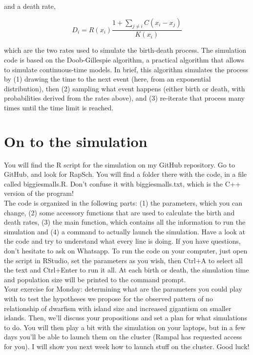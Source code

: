 \documentclass[12pt]{article}
\begin{document}
and a death rate,

\[
D_i = R(x_i) \frac{1 + \sum_{j \neq i} C(x_i - x_j)}{K(x_i)}
\]

which are the two rates used to simulate the birth-death process. The simulation code is based on the Doob-Gillespie algorithm, a practical algorithm that allows to simulate continuous-time models. In brief, this algorithm simulates the process by (1) drawing the time to the next event (here, from an exponential distribution), then (2) sampling what event happens (either birth or death, with probabilities derived from the rates above), and (3) re-iterate that process many times until the time limit is reached.





\section{On to the simulation}

You will find the R script for the simulation on my GitHub repository. Go to GitHub, and look for RapSch. You will find a folder there with the code, in a file called biggiesmalls.R. Don't confuse it with biggiesmalls.txt, which is the C++ version of the program!\\

The code is organized in the following parts: (1) the parameters, which you can change, (2) some accessory functions that are used to calculate the birth and death rates, (3) the main function, which contains all the information to run the simulation and (4) a command to actually launch the simulation. Have a look at the code and try to understand what every line is doing. If you have questions, don't hesitate to ask on Whatsapp. To run the code on your computer, just open the script in RStudio, set the parameters as you wish, then Ctrl+A to select all the text and Ctrl+Enter to run it all. At each birth or death, the simulation time and population size will be printed to the command prompt.\\

Your exercise for Monday: determining what are the parameters you could play with to test the hypotheses we propose for the observed pattern of no relationship of dwarfism with island size and increased gigantism on smaller islands. Then, we'll discuss your propositions and set a plan for what simulations to do. You will then play a bit with the simulation on your laptops, but in a few days you'll be able to launch them on the cluster (Rampal has requested access for you). I will show you next week how to launch stuff on the cluster. Good luck!\\
\end{document}
